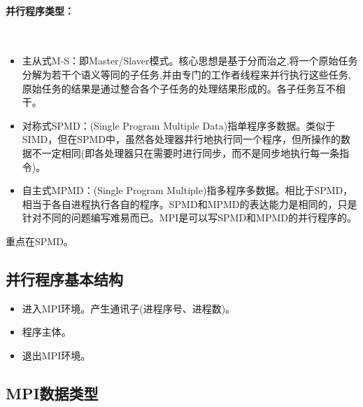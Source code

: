 \documentclass[UTF8]{article}%
\begin{document}
\paragraph{并行程序类型：}~{}

\begin{itemize}
    \item 主从式M-S：即Master/Slaver模式。核心思想是基于分而治之,将一个原始任务分解为若干个语义等同的子任务,并由专门的工作者线程来并行执行这些任务,原始任务的结果是通过整合各个子任务的处理结果形成的。各子任务互不相干。
    \item 对称式SPMD：(Single Program Multiple Data)指单程序多数据。类似于SIMD，但在SPMD中，虽然各处理器并行地执行同一个程序，但所操作的数据不一定相同(即各处理器只在需要时进行同步，而不是同步地执行每一条指令)。
    \item 自主式MPMD：(Single Program Multiple)指多程序多数据。相比于SPMD，相当于各自进程执行各自的程序。SPMD和MPMD的表达能力是相同的，只是针对不同的问题编写难易而已。MPI是可以写SPMD和MPMD的并行程序的。
\end{itemize}

重点在SPMD。

\subsection{并行程序基本结构}

\begin{itemize}
    \item 进入MPI环境。产生通讯子(进程序号、进程数)。
    \item 程序主体。
    \item 退出MPI环境。
\end{itemize}

\subsection{MPI数据类型}
\end{document}
